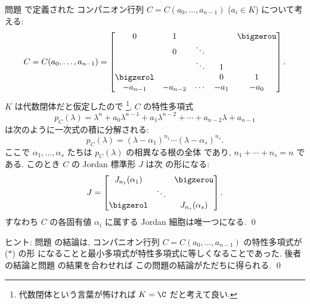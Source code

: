 \documentclass[12pt,twoside]{jarticle}
\begin{document}
\begin{question}
\label{q:Jordan-companion-1}
  問題  で定義された
  コンパニオン行列 $C=C(a_0,\dots,a_{n-1})$ ($a_i\in K$) について考える:
  \begin{equation*}
    C =
    C(a_0,\dots,a_{n-1}) =
    \begin{bmatrix}
      0         &    1     &        &      & \bigzerou \\
                &    0     & \ddots &      & \\
                &          & \ddots &  1   & \\
      \bigzerol &          &        &  0   &  1 \\
      -a_{n-1}  & -a_{n-2} & \cdots & -a_1 & -a_0 \\
    \end{bmatrix}.
  \end{equation*}
  $K$ は代数閉体だと仮定したので%
  \footnote{代数閉体という言葉が怖ければ $K=\C$ だと考えて良い.},
  $C$ の特性多項式
  \begin{equation*}
    p_C(\lambda)
    = \lambda^n + a_0\lambda^{n-1} + a_1\lambda^{n-2}
    + \cdots + a_{n-2}\lambda + a_{n-1}
    \tag{$\ast$}
  \end{equation*}
  は次のように一次式の積に分解される:
  \begin{equation*}
    p_C(\lambda) = (\lambda-\alpha_1)^{n_1}\cdots(\lambda-\alpha_s)^{n_s}.
  \end{equation*}
  ここで $\alpha_1,\dots,\alpha_s$ たちは $p_C(\lambda)$ の相異なる根の全体
  であり, $n_1+\cdots+n_s=n$ である.  このとき $C$ の Jordan 標準形 $J$ は次
  の形になる: 
  \begin{equation*}
    J = 
    \begin{bmatrix}
      J_{n_1}(\alpha_1) &        & \bigzerou \\
                        & \ddots & \\
      \bigzerol         &        & J_{n_s}(\alpha_s) \\
    \end{bmatrix}.
  \end{equation*}
  すなわち $C$ の各固有値 $\alpha_i$ に属する Jordan 細胞は唯一つになる.
  \qed
\end{question}

\noindent
ヒント:  問題  の結論は,
コンパニオン行列 $C=C(a_0,\dots,a_{n-1})$ の特性多項式が ($\ast$) の形
になることと最小多項式が特性多項式に等しくなることであった.
後者の結論と問題  の結果を合わせれば
この問題の結論がただちに得られる.
\qed
\end{document}
